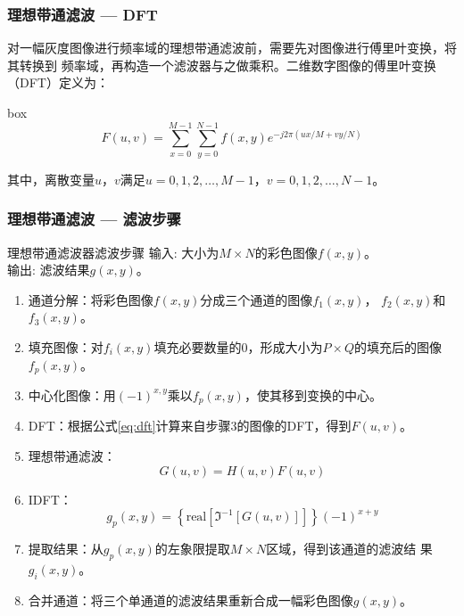 \documentclass[xcolor=svgnames,serif,table,10pt]{beamer}
\begin{document}
\begin{frame}
  \frametitle{理想带通滤波 --- DFT}
  对一幅灰度图像进行频率域的理想带通滤波前，需要先对图像进行傅里叶变换，将其转换到
  频率域，再构造一个滤波器与之做乘积。二维数字图像的傅里叶变换（DFT）定义为：

  \medskip
  \begin{beamercolorbox}[shadow=true,sep=0pt,rounded=true]{box}
    \begin{equation}
      \label{eq:dft}
      F(u,v)=\sum_{x=0}^{M-1}\sum_{y=0}^{N-1}f(x,y)e^{-j2\pi(ux/M+vy/N)}
    \end{equation}
  \end{beamercolorbox}
  
  其中，离散变量$u$，$v$满足$u=0,1,2,\ldots,M-1$，$v=0,1,2,\ldots,N-1$。
\end{frame}

\begin{frame}
  \frametitle{理想带通滤波 --- 滤波步骤}
  \scriptsize
  \begin{exampleblock}{理想带通滤波器滤波步骤}
    \textcolor{black!60!green}{输入}: 大小为$M\times N$的彩色图像$f(x,y)$。\\
    \textcolor{black!60!green}{输出}: 滤波结果$g(x,y)$。\\ \vspace{-.5em}
    \begin{enumerate}[(S1)]
    \item 通道分解：将彩色图像$f(x,y)$分成三个通道的图像$f_1(x,y)$，
    $f_2(x,y)$和$f_3(x,y)$。
    \item 填充图像：对$f_i(x,y)$填充必要数量的0，形成大小为$P\times Q$的填充后的图像
    $f_{p}(x,y)$。
    \item 中心化图像：用$(-1)^{x,y}$乘以$f_{p}(x,y)$，使其移到变换的中心。
    \item DFT：根据公式\ref{eq:dft}计算来自步骤3的图像的DFT，得到$F(u,v)$。
    \item 理想带通滤波：$$G(u,v)=H(u,v)F(u,v)$$
    \item IDFT：$$g_p(x,y)=\left\{
      \mbox{real}[\Im^{-1}[G(u,v)]] \right\}(-1)^{x+y}$$ 
    \item 提取结果：从$g_p(x,y)$的左象限提取$M\times N$区域，得到该通道的滤波结
    果$g_i(x,y)$。
    \item 合并通道：将三个单通道的滤波结果重新合成一幅彩色图像$g(x,y)$。
    \end{enumerate}
  \end{exampleblock}
\end{frame}
\end{document}
